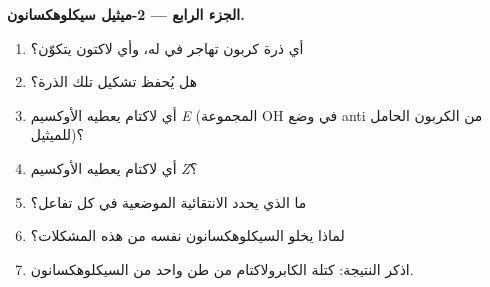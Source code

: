 \begin{problem}
\medskip\noindent\textbf{الجزء الرابع --- 2-ميثيل سيكلوهكسانون.}
\begin{enumerate}[resume]
  \item أي ذرة كربون تهاجر في  له، وأي لاكتون يتكوّن؟
  \item هل يُحفظ تشكيل تلك الذرة؟
  \item أي لاكتام يعطيه الأوكسيم \textit{E} (المجموعة OH في وضع anti من الكربون الحامل للميثيل)؟
  \item أي لاكتام يعطيه الأوكسيم \textit{Z}؟
  \item ما الذي يحدد الانتقائية الموضعية في كل تفاعل؟
  \item لماذا يخلو السيكلوهكسانون نفسه من هذه المشكلات؟
  \item اذكر النتيجة: كتلة الكابرولاكتام من طن واحد من السيكلوهكسانون.
\end{enumerate}
\end{problem}
